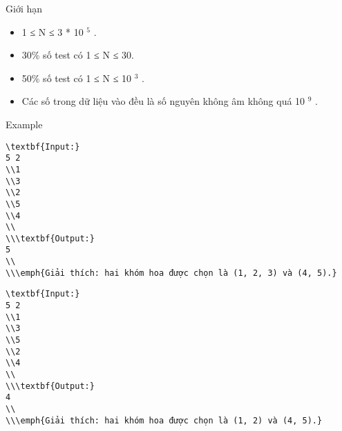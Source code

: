 Giới hạn
\begin{itemize}
	\item     1 ≤ N ≤ 3 * 10    $^     5    $    .   
	\item     30\% số test có 1 ≤ N ≤ 30.   
	\item     50\% số test có 1 ≤ N ≤ 10    $^     3    $    .   
	\item     Các số trong dữ liệu vào đều là số nguyên không âm không quá 10    $^     9    $    .   
\end{itemize}
Example
\begin{verbatim}
\textbf{Input:}
5 2
\\1 
\\3 
\\2 
\\5 
\\4
\\
\\\textbf{Output:}
5
\\
\\\emph{Giải thích: hai khóm hoa được chọn là (1, 2, 3) và (4, 5).}\end{verbatim}
\begin{verbatim}
\textbf{Input:}
5 2
\\1 
\\3 
\\5 
\\2 
\\4
\\
\\\textbf{Output:}
4
\\
\\\emph{Giải thích: hai khóm hoa được chọn là (1, 2) và (4, 5).}\end{verbatim}